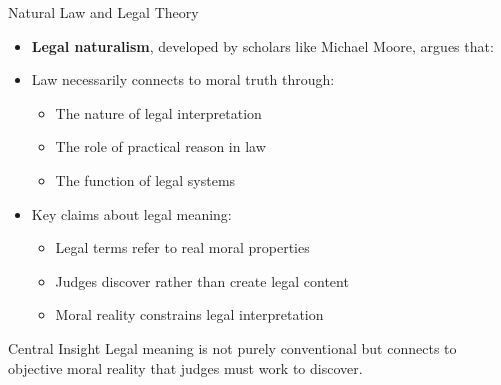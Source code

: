 \documentclass{beamer}
\begin{document}
\begin{frame}{Natural Law and Legal Theory}
    \begin{itemize}
        \item \textbf{Legal naturalism}, developed by scholars like Michael Moore, argues that:
        
        \item Law necessarily connects to moral truth through:
        \begin{itemize}
            \item The nature of legal interpretation
            \item The role of practical reason in law
            \item The function of legal systems
        \end{itemize}
        
        \item Key claims about legal meaning:
            \begin{itemize}
                \item Legal terms refer to real moral properties
                \item Judges discover rather than create legal content
                \item Moral reality constrains legal interpretation
            \end{itemize}
    \end{itemize}
    
    \begin{alertblock}{Central Insight}
        Legal meaning is not purely conventional but connects to objective moral reality that judges must work to discover.
    \end{alertblock}
\end{frame}
\end{document}
